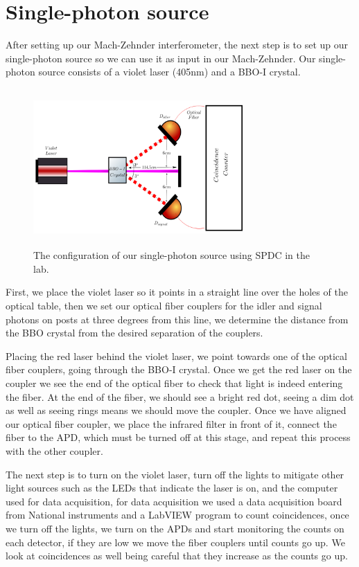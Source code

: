 \documentclass[12pt]{book}
\begin{document}
\section{Single-photon source}

After setting up our Mach-Zehnder interferometer, the next step is to set up our single-photon source so we can use it as input in our Mach-Zehnder. Our single-photon source consists of a violet laser (405nm) and a BBO-I crystal.


\begin{figure}[t!]
\center
\includegraphics[width=8cm,height=6cm]{images/sPDC.png}
\caption{The configuration of our single-photon source using SPDC in the lab.}
\end{figure} 

First, we place the violet laser so it points in a straight line over the holes of the optical table, then we set our optical fiber couplers for the idler and signal photons on posts at three degrees from this line, we determine the distance from the BBO crystal from the desired separation of the couplers.






Placing the red laser behind the violet laser, we point towards one of the optical fiber couplers, going through the BBO-I crystal. Once we get the red laser on the coupler we see the end of the optical fiber to check that light is indeed entering the fiber. At the end of the fiber, we should see a bright red dot, seeing a dim dot as well as seeing rings means we should move the coupler. Once we have aligned our optical fiber coupler, we place the infrared filter in front of it, connect the fiber to the APD, which must be turned off at this stage, and repeat this process with the other coupler.

The next step is to turn on the violet laser, turn off the lights to mitigate other light sources such as the LEDs that indicate the laser is on, and the computer used for data acquisition, for data acquisition we used a data acquisition board from National instruments and a LabVIEW program to count coincidences, once we turn off the lights, we turn on the APDs and start monitoring the counts on each detector, if they are low we move the fiber couplers until counts go up. We look at coincidences as well being careful that they increase as the counts go up.
\end{document}
